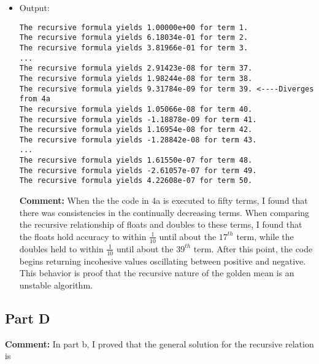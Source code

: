 \documentclass[10pt]{article}
\begin{document}
\begin{itemize}
\begin{verbatim}
int main() {
        double n, phi_0 = 1, phi_1 = (sqrt(5)-1)/2, phi_ho; 
        for (n = 0; n < 50; n++) {
                if (n < 1){       /* Defines the phi raised to the zeroeth power */
                        phi_ho = phi_0;
                }
                else if (n < 2){
                        phi_ho = phi_1;
                }
                else {            /* Establishes recursive relationship*/            
                        phi_ho = phi_0 - phi_1; 
                        phi_0 = phi_1;
                        phi_1 = phi_ho;
                }
             printf("The recursive formula yields %.5e for term %.0f. \n",
             phi_ho, n+1);
        }
        return 0;
}
\end{verbatim}
\item Output:
\begin{verbatim}
The recursive formula yields 1.00000e+00 for term 1. 
The recursive formula yields 6.18034e-01 for term 2. 
The recursive formula yields 3.81966e-01 for term 3.  
... 
The recursive formula yields 2.91423e-08 for term 37. 
The recursive formula yields 1.98244e-08 for term 38. 
The recursive formula yields 9.31784e-09 for term 39. <----Diverges from 4a
The recursive formula yields 1.05066e-08 for term 40.
The recursive formula yields -1.18878e-09 for term 41. 
The recursive formula yields 1.16954e-08 for term 42. 
The recursive formula yields -1.28842e-08 for term 43. 
...
The recursive formula yields 1.61550e-07 for term 48. 
The recursive formula yields -2.61057e-07 for term 49. 
The recursive formula yields 4.22608e-07 for term 50. 
\end{verbatim}
\textbf{Comment:} When the the code in 4a is executed to fifty terms, I found that there was consistencies in the continually decreasing terms. When comparing the recursive relationship of floats and doubles to these terms, I found that the floats hold accuracy to within $\frac{1}{10}$ until about the $17^{th}$ term, while the doubles held to within $\frac{1}{10}$ until about the $39^{th}$ term. After this point, the code begins returning incohesive values oscillating between positive and negative. This behavior is proof that the recursive nature of the golden mean is an unstable algorithm. 
\end{itemize} 
\subsection{Part D}
\textbf{Comment:} In part b, I proved that the general solution for the recursive relation is 
\end{document}
